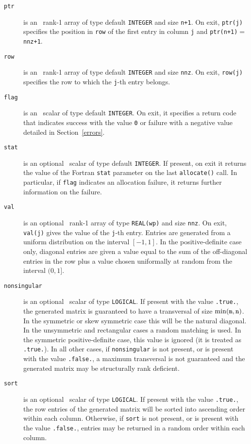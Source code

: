 \documentclass{spral}
\begin{document}
\begin{description}
\item[\texttt{ptr}] is an \intentout\ rank-1 array of type default {\tt INTEGER}
   and size {\tt n+1}. On exit, {\tt ptr(j)} specifies the position in {\tt row}
   of the first entry in column {\tt j} and {\tt ptr(n+1)$=$nnz+1}.

\item[\texttt{row}] is an \intentout\ rank-1 array of type default {\tt INTEGER}
   and size {\tt nnz}. On exit, {\tt row(j)} specifies the row to which the
   {\tt j}-th entry belongs.

\item[\texttt{flag}] is an \intentout\ scalar of type default {\tt INTEGER}.
   On exit, it specifies a return code that indicates success with the value
   {\tt 0} or failure with a negative value detailed in Section~\ref{errors}.

\item[\texttt{stat}] is an optional \intentout\ scalar of type default
   {\tt INTEGER}. If present, on exit it returns the value of the Fortran
   \texttt{stat} parameter on the last \texttt{allocate()} call. In particular,
   if \texttt{flag} indicates an allocation failure, it returns further
   information on the failure.

\item[\texttt{val}] is an optional \intentout\ rank-1 array of type
   {\tt REAL(wp)} and size \texttt{nnz}. On exit, \texttt{val(j)} gives
   the value of the \texttt{j}-th entry. Entries are generated from a uniform
   distribution on the interval $[-1,1]$. In the positive-definite case only,
   diagonal entries are given a value equal to the sum of the off-diagonal
   entries in the row plus a value chosen uniformally at random from the
   interval $(0,1]$.

\item[\texttt{nonsingular}] is an optional \intentin\ scalar of type
   {\tt LOGICAL}. If present with the value {\tt .true.}, the generated matrix
   is guaranteed to have a transversal of size $\min({\tt m}, {\tt n})$. In
   the symmetric or skew symmetric case this will be the natural diagonal. In
   the unsymmetric and rectangular cases a random matching is used. In the
   symmetric positive-definite case, this value is ignored (it is treated as
   {\tt.true.}).
   In all other cases, if {\tt nonsingular} is not present, or is present with
   the value {\tt .false.}, a maximum transversal is not guaranteed and the
   generated matrix may be structurally rank deficient.

\item[\texttt{sort}] is an optional \intentin\ scalar of type {\tt LOGICAL}. If
   present with the value {\tt .true.}, the row entries of the generated matrix
   will be sorted into ascending order within each column.
   Otherwise, if {\tt sort} is not present, or is present with the value
   {\tt .false.}, entries may be returned in a random order within each column.

\end{description}
\end{document}
